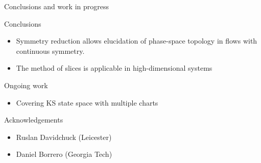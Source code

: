 \begin{frame}{Conclusions and work in progress}

\begin{block}{Conclusions}
 \begin{itemize}
  \item Symmetry reduction allows elucidation of phase-space topology in flows with continuous symmetry.
  \item The method of slices is applicable in high-dimensional systems
 \end{itemize}
\end{block} 
\begin{block}{Ongoing work}
  \begin{itemize}
   \item Covering KS state space with multiple charts  
  \end{itemize}
\end{block}


\begin{block}{Acknowledgements}
 \begin{itemize}
  \item Ruslan Davidchuck (Leicester)
  \item Daniel Borrero (Georgia Tech)
 \end{itemize}
\end{block}

\end{frame}






